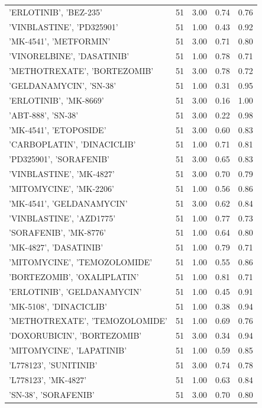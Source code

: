 \begin{center}
\begin{longtable}{@{}lcccc@{}}
    'ERLOTINIB', 'BEZ-235' & 51 & 3.00 & 0.74 & 0.76 \\
    'VINBLASTINE', 'PD325901' & 51 & 1.00 & 0.43 & 0.92 \\
    'MK-4541', 'METFORMIN' & 51 & 3.00 & 0.71 & 0.80 \\
    'VINORELBINE', 'DASATINIB' & 51 & 1.00 & 0.78 & 0.71 \\
    'METHOTREXATE', 'BORTEZOMIB' & 51 & 3.00 & 0.78 & 0.72 \\
    'GELDANAMYCIN', 'SN-38' & 51 & 1.00 & 0.31 & 0.95 \\
    'ERLOTINIB', 'MK-8669' & 51 & 3.00 & 0.16 & 1.00 \\
    'ABT-888', 'SN-38' & 51 & 3.00 & 0.22 & 0.98 \\
    'MK-4541', 'ETOPOSIDE' & 51 & 3.00 & 0.60 & 0.83 \\
    'CARBOPLATIN', 'DINACICLIB' & 51 & 1.00 & 0.71 & 0.81 \\
    'PD325901', 'SORAFENIB' & 51 & 3.00 & 0.65 & 0.83 \\
    'VINBLASTINE', 'MK-4827' & 51 & 3.00 & 0.70 & 0.79 \\
    'MITOMYCINE', 'MK-2206' & 51 & 1.00 & 0.56 & 0.86 \\
    'MK-4541', 'GELDANAMYCIN' & 51 & 3.00 & 0.62 & 0.84 \\
    'VINBLASTINE', 'AZD1775' & 51 & 1.00 & 0.77 & 0.73 \\
    'SORAFENIB', 'MK-8776' & 51 & 1.00 & 0.64 & 0.80 \\
    'MK-4827', 'DASATINIB' & 51 & 1.00 & 0.79 & 0.71 \\
    'MITOMYCINE', 'TEMOZOLOMIDE' & 51 & 1.00 & 0.55 & 0.86 \\
    'BORTEZOMIB', 'OXALIPLATIN' & 51 & 1.00 & 0.81 & 0.71 \\
    'ERLOTINIB', 'GELDANAMYCIN' & 51 & 1.00 & 0.45 & 0.91 \\
    'MK-5108', 'DINACICLIB' & 51 & 1.00 & 0.38 & 0.94 \\
    'METHOTREXATE', 'TEMOZOLOMIDE' & 51 & 1.00 & 0.69 & 0.76 \\
    'DOXORUBICIN', 'BORTEZOMIB' & 51 & 3.00 & 0.34 & 0.94 \\
    'MITOMYCINE', 'LAPATINIB' & 51 & 1.00 & 0.59 & 0.85 \\
    'L778123', 'SUNITINIB' & 51 & 3.00 & 0.74 & 0.78 \\
    'L778123', 'MK-4827' & 51 & 1.00 & 0.63 & 0.84 \\
    'SN-38', 'SORAFENIB' & 51 & 3.00 & 0.70 & 0.80 \\

\end{longtable}
\end{center}
